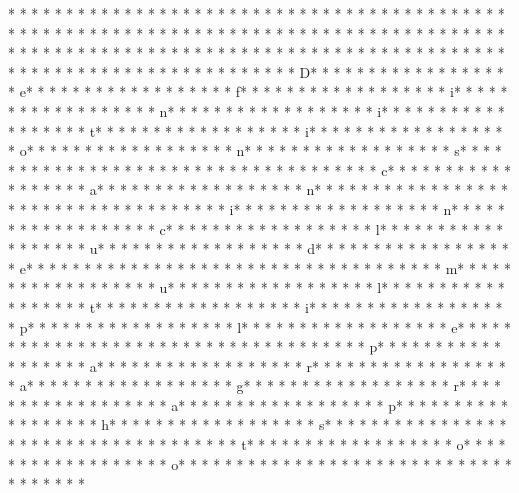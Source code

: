 * * *  * * *  * * *  *  * * *  *  * * *  * * *  * * *  *  * * *  *  * * *  * * *  * * *  *  * * *  *  * * *  *  * * *  * * *  * * *  *  * * *  *  * * *  *  * * *  * * *  * * *  *  * * *  *  * * *  *  * * *  * * *  * * *  *  * * *  *  * * *  *  * * *  * * *  * * *  *  * * *  *  * * *  *  * * *  * * *  * * *  *  * * *  *  * * *  *  * * *  * * *  * * *  *  * * *  *  * * *  * D* * *  * * *  * * *  *  * * *  *  * * *  * e* * *  * * *  * * *  *  * * *  *  * * *  * f* * *  * * *  * * *  *  * * *  *  * * *  * i* * *  * * *  * * *  *  * * *  *  * * *  * n* * *  * * *  * * *  *  * * *  *  * * *  * i* * *  * * *  * * *  *  * * *  *  * * *  * t* * *  * * *  * * *  *  * * *  *  * * *  * i* * *  * * *  * * *  *  * * *  *  * * *  * o* * *  * * *  * * *  *  * * *  *  * * *  * n* * *  * * *  * * *  *  * * *  *  * * *  * s* * *  * * *  * * *  *  * * *  *  * * *  *  * * *  * * *  * * *  *  * * *  *  * * *  * c* * *  * * *  * * *  *  * * *  *  * * *  * a* * *  * * *  * * *  *  * * *  *  * * *  * n* * *  * * *  * * *  *  * * *  *  * * *  *  * * *  * * *  * * *  *  * * *  *  * * *  * i* * *  * * *  * * *  *  * * *  *  * * *  * n* * *  * * *  * * *  *  * * *  *  * * *  * c* * *  * * *  * * *  *  * * *  *  * * *  * l* * *  * * *  * * *  *  * * *  *  * * *  * u* * *  * * *  * * *  *  * * *  *  * * *  * d* * *  * * *  * * *  *  * * *  *  * * *  * e* * *  * * *  * * *  *  * * *  *  * * *  *  * * *  * * *  * * *  *  * * *  *  * * *  * m* * *  * * *  * * *  *  * * *  *  * * *  * u* * *  * * *  * * *  *  * * *  *  * * *  * l* * *  * * *  * * *  *  * * *  *  * * *  * t* * *  * * *  * * *  *  * * *  *  * * *  * i* * *  * * *  * * *  *  * * *  *  * * *  * p* * *  * * *  * * *  *  * * *  *  * * *  * l* * *  * * *  * * *  *  * * *  *  * * *  * e* * *  * * *  * * *  *  * * *  *  * * *  *  * * *  * * *  * * *  *  * * *  *  * * *  * p* * *  * * *  * * *  *  * * *  *  * * *  * a* * *  * * *  * * *  *  * * *  *  * * *  * r* * *  * * *  * * *  *  * * *  *  * * *  * a* * *  * * *  * * *  *  * * *  *  * * *  * g* * *  * * *  * * *  *  * * *  *  * * *  * r* * *  * * *  * * *  *  * * *  *  * * *  * a* * *  * * *  * * *  *  * * *  *  * * *  * p* * *  * * *  * * *  *  * * *  *  * * *  * h* * *  * * *  * * *  *  * * *  *  * * *  * s* * *  * * *  * * *  *  * * *  *  * * *  *  * * *  * * *  * * *  *  * * *  *  * * *  * t* * *  * * *  * * *  *  * * *  *  * * *  * o* * *  * * *  * * *  *  * * *  *  * * *  * o* * *  * * *  * * *  *  * * *  *  * * *  * 
* * *  * * *  * * *  *  * * *  *  * * *  * 

